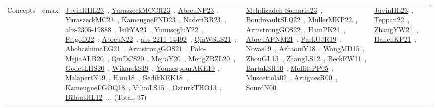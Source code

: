 {\begin{longtable}{lp{3cm}>{\raggedright\arraybackslash}p{6cm}>{\raggedright\arraybackslash}p{6cm}>{\raggedright\arraybackslash}p{8cm}}
Concepts & cmax & \href{works/JuvinHHL23.pdf}{JuvinHHL23}~\cite{JuvinHHL23}, \href{works/YuraszeckMCCR23.pdf}{YuraszeckMCCR23}~\cite{YuraszeckMCCR23}, \href{works/AbreuNP23.pdf}{AbreuNP23}~\cite{AbreuNP23}, \href{works/YuraszeckMC23.pdf}{YuraszeckMC23}~\cite{YuraszeckMC23}, \href{works/KameugneFND23.pdf}{KameugneFND23}~\cite{KameugneFND23}, \href{works/NaderiRR23.pdf}{NaderiRR23}~\cite{NaderiRR23}, \href{works/abs-2305-19888.pdf}{abs-2305-19888}~\cite{abs-2305-19888}, \href{works/IsikYA23.pdf}{IsikYA23}~\cite{IsikYA23}, \href{works/YunusogluY22.pdf}{YunusogluY22}~\cite{YunusogluY22}, \href{works/FetgoD22.pdf}{FetgoD22}~\cite{FetgoD22}, \href{works/AbreuN22.pdf}{AbreuN22}~\cite{AbreuN22}, \href{works/abs-2211-14492.pdf}{abs-2211-14492}~\cite{abs-2211-14492}, \href{works/QinWSLS21.pdf}{QinWSLS21}~\cite{QinWSLS21}, \href{works/AbohashimaEG21.pdf}{AbohashimaEG21}~\cite{AbohashimaEG21}, \href{works/ArmstrongGOS21.pdf}{ArmstrongGOS21}~\cite{ArmstrongGOS21}, \href{works/Polo-MejiaALB20.pdf}{Polo-MejiaALB20}~\cite{Polo-MejiaALB20}, \href{works/QinDCS20.pdf}{QinDCS20}~\cite{QinDCS20}, \href{works/MejiaY20.pdf}{MejiaY20}~\cite{MejiaY20}, \href{works/MengZRZL20.pdf}{MengZRZL20}~\cite{MengZRZL20}, \href{works/GodetLHS20.pdf}{GodetLHS20}~\cite{GodetLHS20}, \href{works/WikarekS19.pdf}{WikarekS19}~\cite{WikarekS19}, \href{works/YounespourAKE19.pdf}{YounespourAKE19}~\cite{YounespourAKE19}, \href{works/MalapertN19.pdf}{MalapertN19}~\cite{MalapertN19}, \href{works/Ham18.pdf}{Ham18}~\cite{Ham18}, \href{works/GedikKEK18.pdf}{GedikKEK18}~\cite{GedikKEK18}, \href{works/KameugneFGOQ18.pdf}{KameugneFGOQ18}~\cite{KameugneFGOQ18}, \href{works/VilimLS15.pdf}{VilimLS15}~\cite{VilimLS15}, \href{works/OzturkTHO13.pdf}{OzturkTHO13}~\cite{OzturkTHO13}, \href{works/BillautHL12.pdf}{BillautHL12}~\cite{BillautHL12}... (Total: 37) & \href{works/Mehdizadeh-Somarin23.pdf}{Mehdizadeh-Somarin23}~\cite{Mehdizadeh-Somarin23}, \href{works/BoudreaultSLQ22.pdf}{BoudreaultSLQ22}~\cite{BoudreaultSLQ22}, \href{works/MullerMKP22.pdf}{MullerMKP22}~\cite{MullerMKP22}, \href{works/ArmstrongGOS22.pdf}{ArmstrongGOS22}~\cite{ArmstrongGOS22}, \href{works/HamPK21.pdf}{HamPK21}~\cite{HamPK21}, \href{works/AbreuAPNM21.pdf}{AbreuAPNM21}~\cite{AbreuAPNM21}, \href{works/ParkUJR19.pdf}{ParkUJR19}~\cite{ParkUJR19}, \href{works/Novas19.pdf}{Novas19}~\cite{Novas19}, \href{works/ArbaouiY18.pdf}{ArbaouiY18}~\cite{ArbaouiY18}, \href{works/WangMD15.pdf}{WangMD15}~\cite{WangMD15}, \href{works/ZhouGL15.pdf}{ZhouGL15}~\cite{ZhouGL15}, \href{works/ZhangLS12.pdf}{ZhangLS12}~\cite{ZhangLS12}, \href{works/BeckFW11.pdf}{BeckFW11}~\cite{BeckFW11}, \href{works/BartakSR10.pdf}{BartakSR10}~\cite{BartakSR10}, \href{works/MoffittPP05.pdf}{MoffittPP05}~\cite{MoffittPP05}, \href{works/Muscettola02.pdf}{Muscettola02}~\cite{Muscettola02}, \href{works/ArtiguesR00.pdf}{ArtiguesR00}~\cite{ArtiguesR00}, \href{works/SourdN00.pdf}{SourdN00}~\cite{SourdN00} & \href{works/JuvinHL23.pdf}{JuvinHL23}~\cite{JuvinHL23}, \href{works/Teppan22.pdf}{Teppan22}~\cite{Teppan22}, \href{works/ZhangYW21.pdf}{ZhangYW21}~\cite{ZhangYW21}, \href{works/HanenKP21.pdf}{HanenKP21}~\cite{HanenKP21}, 
\end{longtable}}
